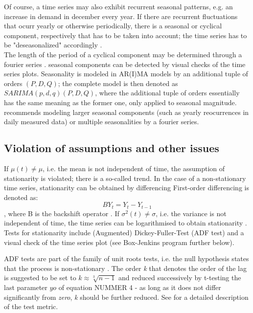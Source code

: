 \documentclass[a4paper, 11pt]{article}
\begin{document}
Of course, a time series may also exhibit recurrent seasonal patterns, e.g. an increase in demand in december every year. If there are recurrent fluctuations that ocurr yearly or otherwise periodically, there is a seasonal or cyclical component, respectively \citep{Vogel.2015} that has to be taken into account; the time series has to be "deseasonalized" accordingly \citep{Benkachcha.2015}.\\
The length of the period of a cyclical component may be determined through a fourier series \citep{Vogel.2015}.
seasonal components can be detected by visual checks of the time series plots.
Seasonality is modeled in AR(I)MA models by an additional tuple of orders $(P,D,Q)$; the complete model is then denoted as $SARIMA(p,d,q)(P,D,Q)$, where the additional tuple of orders essentially has the same meaning as the former one, only applied to seasonal magnitude.  
\cite{Hyndman.2008} recommends modeling larger seasonal components (such as yearly reocurrences in daily measured data) or multiple seasonalities by a fourier series.

\subsection{Violation of assumptions and other issues}
If $\mu(t) \neq \mu$, i.e. the mean is not independent of time, the assumption of stationarity is violated; there is a so-called trend. In the case of a non-stationary time series, stationarity can be obtained by differencing \citep{Andreoni.2006b, Hunt.2003}
First-order differencing is denoted as:
\begin{equation}
BY_{t} = Y_{t} - Y_{t-1}
\end{equation}
, where B is the backshift operator \citep{Hunt.2003}.
If $\sigma^2(t) \neq \sigma$, i.e. the variance is not independent of time, the time series can be logarithmised to obtain stationarity \citep{Andreoni.2006b}.
Tests for stationarity include (Augmented) Dickey-Fuller-Test (ADF test) \citep{Zhao.07022018} and a visual check of the time series plot (see Box-Jenkins program further below). 

ADF tests are part of the family of unit roots tests, i.e. the null hypothesis states that the process is non-stationary \citep{Zhao.07022018}. The order \textit{k} that denotes the order of the lag is suggested to be set to $k \approx \sqrt[3]{n-1}$ and reduced successively by t-testing the last parameter $yo$ of equation NUMMER 4 - as long as it does not differ significantly from \textit{zero}, \textit{k} should be further reduced. See \cite{Vogel.2015} for a detailed description of the test metric.
\end{document}
